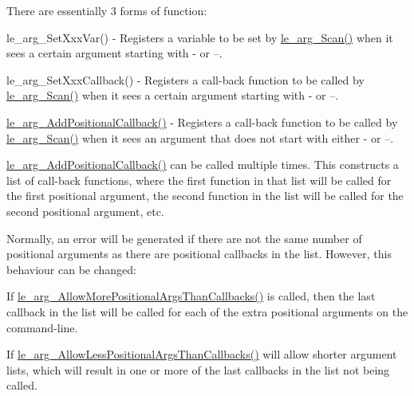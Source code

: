 There are essentially 3 forms of function\+:


\begin{DoxyItemize}
\item le\+\_\+arg\+\_\+\+Set\+Xxx\+Var() -\/ Registers a variable to be set by \hyperlink{le__args_8h_af44485fc914a7ac6f562d23d66c3410c}{le\+\_\+arg\+\_\+\+Scan()} when it sees a certain argument starting with \textquotesingle{}-\/\textquotesingle{} or \textquotesingle{}--\textquotesingle{}.
\item le\+\_\+arg\+\_\+\+Set\+Xxx\+Callback() -\/ Registers a call-\/back function to be called by \hyperlink{le__args_8h_af44485fc914a7ac6f562d23d66c3410c}{le\+\_\+arg\+\_\+\+Scan()} when it sees a certain argument starting with \textquotesingle{}-\/\textquotesingle{} or \textquotesingle{}--\textquotesingle{}.
\item \hyperlink{le__args_8h_a525bef6095a4655e97008e27a4829d44}{le\+\_\+arg\+\_\+\+Add\+Positional\+Callback()} -\/ Registers a call-\/back function to be called by \hyperlink{le__args_8h_af44485fc914a7ac6f562d23d66c3410c}{le\+\_\+arg\+\_\+\+Scan()} when it sees an argument that does not start with either \textquotesingle{}-\/\textquotesingle{} or \textquotesingle{}--\textquotesingle{}.
\end{DoxyItemize}

\hyperlink{le__args_8h_a525bef6095a4655e97008e27a4829d44}{le\+\_\+arg\+\_\+\+Add\+Positional\+Callback()} can be called multiple times. This constructs a list of call-\/back functions, where the first function in that list will be called for the first positional argument, the second function in the list will be called for the second positional argument, etc.

Normally, an error will be generated if there are not the same number of positional arguments as there are positional callbacks in the list. However, this behaviour can be changed\+:


\begin{DoxyItemize}
\item If \hyperlink{le__args_8h_ab646cfcb831e13312bff496221e74acc}{le\+\_\+arg\+\_\+\+Allow\+More\+Positional\+Args\+Than\+Callbacks()} is called, then the last callback in the list will be called for each of the extra positional arguments on the command-\/line.
\item If \hyperlink{le__args_8h_aedcaae9ee7e7cc9cf83c30435f6ae653}{le\+\_\+arg\+\_\+\+Allow\+Less\+Positional\+Args\+Than\+Callbacks()} will allow shorter argument lists, which will result in one or more of the last callbacks in the list not being called.
\end{DoxyItemize}


